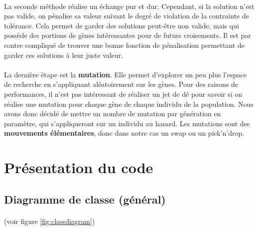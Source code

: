\documentclass[12pt]{article}
\begin{document}
\paragraph{}La seconde méthode réalise un échange pur et dur. Cependant, si la solution n'est pas valide, on pénalise sa valeur suivant le degré de violation de la contrainte de tolérance. Cela permet de garder des solutions peut-être non valide, mais qui possède des portions de gènes intéressantes pour de futurs croisements. Il est par contre compliqué de trouver une bonne fonction de pénalisation permettant de garder ces solutions à leur juste valeur.

\paragraph{}La dernière étape est la \textbf{mutation}. Elle permet d'explorer un peu plus l'espace de recherche en s'appliquant aléatoirement sur les gènes. Pour des raisons de performances, il n'est pas intéressant de réaliser un jet de dé pour savoir si on réalise une mutation pour chaque gène de chaque individu de la population. Nous avons donc décidé de mettre un nombre de mutation par génération en paramètre, qui s'appliqueront sur un individu au hasard. Les mutations sont des \textbf{mouvements élémentaires}, donc dans notre cas un swap ou un pick'n'drop.

\section{Présentation du code}

\subsection{Diagramme de classe (général)}

\paragraph{}(voir figure \ref{fig:classdiagram})
\end{document}
